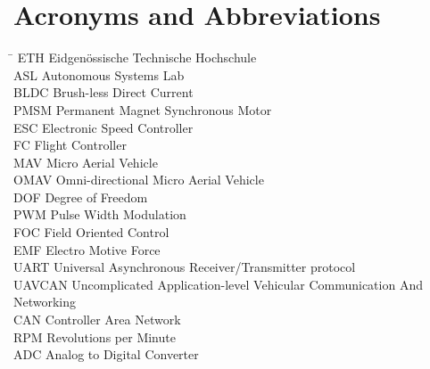 \section*{Acronyms and Abbreviations}
\begin{tabbing}
 \hspace*{1.6cm}  \= \kill
 ETH \> Eidgenössische Technische Hochschule \\[0.5ex]
 ASL \> Autonomous Systems Lab \\[0.5ex]
 BLDC \> Brush-less Direct Current \\[0.5ex]
 PMSM \> Permanent Magnet Synchronous Motor \\[0.5ex]
 ESC \> Electronic Speed Controller \\[0.5ex]
 FC \> Flight Controller\\[0.5ex]
 MAV \> Micro Aerial Vehicle \\[0.5ex]
 OMAV \> Omni-directional Micro Aerial Vehicle\\[0.5ex]
 DOF \> Degree of Freedom\\[0.5ex] 
 PWM \> Pulse Width Modulation\\[0.5ex]
 FOC \> Field Oriented Control \\[0.5ex]
 EMF \> Electro Motive Force \\[0.5ex]
 UART \> Universal Asynchronous Receiver/Transmitter protocol \\[0.5ex]
 UAVCAN \>  Uncomplicated Application-level Vehicular Communication And Networking\\[0.5ex]
CAN \>	Controller Area Network\\ [0.5ex]
RPM \>	Revolutions per Minute\\[0.5ex]
ADC \> Analog to Digital Converter\\[0.5ex]
 \end{tabbing}